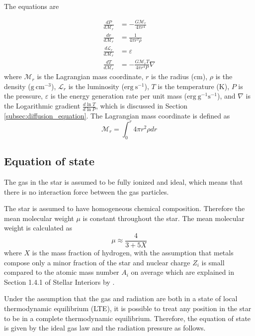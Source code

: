 \documentclass[twocolumn]{aastex631}
\begin{document}
The equations are

\begin{align}
	\frac{d P}{d \mathcal{M}_r}             & =-\frac{G \mathcal{M}_r}{4 \pi r^4}     \label{eq:diff_P}       \\ 
	\frac{d r}{d \mathcal{M}_r}             & =\frac{1}{4 \pi r^2 \rho}             \label{eq:diff_r}         \\ 
	\frac{d \mathcal{L}_r}{d \mathcal{M}_r} & =\varepsilon                          \label{eq:diff_L}         \\ 
	\frac{d T}{d \mathcal{M}_r}             & =-\frac{G \mathcal{M}_r T}{4 \pi r^4 P} \nabla \label{eq:diff_T}
\end{align}
where $\mathcal{M}_r$ is the Lagrangian mass coordinate, $r$ is the radius ($\mathrm{cm}$), $\rho$ is the density ($\mathrm{g ~ cm^{-3}}$), $\mathcal{L}_r$ is the luminosity ($\mathrm{erg ~ s^{-1}}$), $T$ is the temperature ($\mathrm{K}$), $P$ is the pressure, $\varepsilon$ is the energy generation rate per unit mass ($\mathrm{erg ~ g^{-1} s^{-1}}$), and $\nabla$ is the Logarithmic gradient $\frac{d \ln T}{d \ln P}$, which is discussed in Section \ref{subsec:diffusion_equation}. The Lagrangian mass coordinate is defined as
\begin{equation}
	\mathcal{M}_r = \int_0^r 4 \pi r^2 \rho dr
\end{equation}


\subsection{Equation of state}
\label{subsec:equation_of_state}

The gas in the star is assumed to be fully ionized and ideal, which means that there is no interaction force between the gas particles.

The star is assumed to have homogeneous chemical composition. Therefore the mean molecular weight $\mu$ is constant throughout the star. The mean molecular weight is calculated as
\begin{equation}
	\mu \approx \frac{4}{3+5X}
\end{equation}
where $X$ is the mass fraction of hydrogen, with the assumption that metals compose only a minor fraction of the star and nuclear charge $Z_i$ is small compared to the atomic mass number $A_i$ on average which are explained in Section 1.4.1 of Stellar Interiors by \cite{book:StellarInteriors}.


Under the assumption that the gas and radiation are both in a state of local thermodynamic equilibrium (LTE), it is possible to treat any position in the star to be in a complete thermodynamic equilibrium. Therefore, the equation of state is given by the ideal gas law and the radiation pressure as follows.
\end{document}
